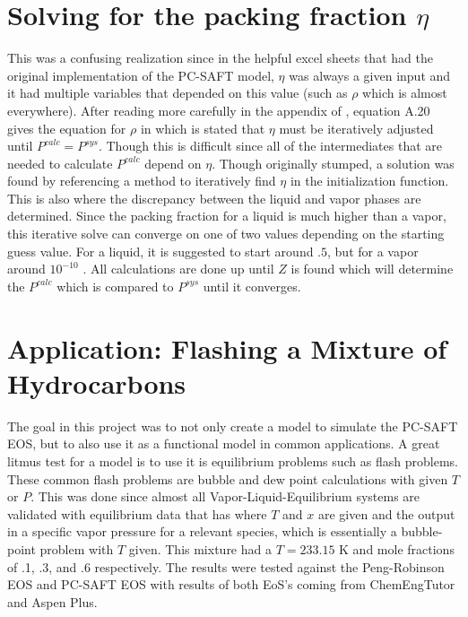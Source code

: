 \documentclass[12pt, letterpaper]{article}
\begin{document}
\section{Solving for the packing fraction $\eta$}
This was a confusing realization since in the helpful excel sheets that had the original implementation of the PC-SAFT model, $\eta$ was always a given input and it had multiple variables that depended on this value (such as $\rho$ which is almost everywhere). After reading more carefully in the appendix of \cite{Gross2001-ow}, equation A.20 gives the equation for $\rho$ in which is stated that $\eta$ must be iteratively adjusted until $P^{calc} = P^{sys}$. Though this is difficult since all of the intermediates that are needed to calculate $P^{calc}$ depend on $\eta$. Though originally stumped, a solution was found by referencing a method to iteratively find $\eta$ in the initialization function. This is also where the discrepancy between the liquid and vapor phases are determined. Since the packing fraction for a liquid is much higher than a vapor, this iterative solve can converge on one of two values depending on the starting guess value. For a liquid, it is suggested to start around $.5$, but for a vapor around $10^{-10}$ \cite{Gross2001-ow}. All calculations are done up until $Z$ is found which will determine the $P^{calc}$ which is compared to $P^{sys}$ until it converges.

\section{Application: Flashing a Mixture of Hydrocarbons}
The goal in this project was to not only create a model to simulate the PC-SAFT EOS, but to also use it as a functional model in common applications. A great litmus test for a model is to use it is equilibrium problems such as flash problems. These common flash problems are bubble and dew point calculations with given $T$ or $P$. This was done since almost all Vapor-Liquid-Equilibrium systems are validated with equilibrium data that has where $T$ and $x$ are given and the output in a specific vapor pressure for a relevant species, which is essentially a bubble-point problem with $T$ given. This mixture had a $T = 233.15 $ K and mole fractions of .1, .3, and .6 respectively. The results were tested against the Peng-Robinson EOS and PC-SAFT EOS with results of both EoS's coming from ChemEngTutor and Aspen Plus.
\end{document}
